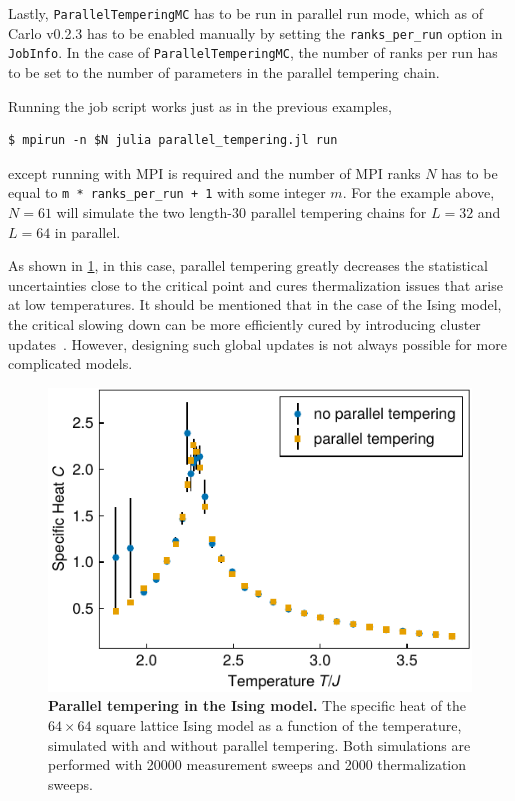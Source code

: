 \documentclass{SciPost}
\begin{document}
Lastly, \texttt{ParallelTemperingMC} has to be run in parallel run mode, which as of Carlo v0.2.3 has to be enabled manually by setting the \texttt{ranks\_{}per\_{}run} option in \texttt{JobInfo}. In the case of \texttt{ParallelTemperingMC}, the number of ranks per run has to be set to the number of parameters in the parallel tempering chain.

Running the job script works just as in the previous examples,
\begin{lstlisting}
$ mpirun -n $N julia parallel_tempering.jl run
\end{lstlisting}
except running with MPI is required and the number of MPI ranks $N$ has to be equal to \texttt{m * ranks\_{}per\_{}run + 1} with some integer $m$. For the example above, $N=61$ will simulate the two length-30 parallel tempering chains for $L=32$ and $L=64$ in parallel.

As shown in \cref{fig:parallel_tempering}, in this case, parallel tempering greatly decreases the statistical uncertainties close to the critical point and cures thermalization issues that arise at low temperatures. It should be mentioned that in the case of the Ising model, the critical slowing down can be more efficiently cured by introducing cluster updates~\cite{Wolff1989}. However, designing such global updates is not always possible for more complicated models.

\begin{figure}
\begin{center}
\includegraphics{figs/parallel_tempering.pdf}
\end{center}
\caption{\textbf{Parallel tempering in the Ising model.} The specific heat of the $64 \times 64$ square lattice Ising model as a function of the temperature, simulated with and without parallel tempering. Both simulations are performed with 20000 measurement sweeps and 2000 thermalization sweeps.}
\label{fig:parallel_tempering}
\end{figure}
\end{document}
